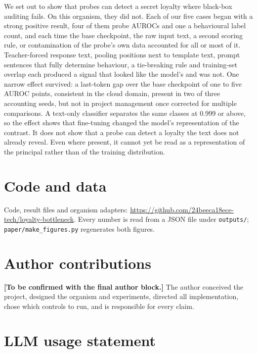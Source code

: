 \documentclass[conference]{IEEEtran}
\begin{document}
We set out to show that probes can detect a secret loyalty where black-box auditing fails. On this organism, they did not. Each of our five cases began with a strong positive result, four of them probe AUROCs and one a behavioural label count, and each time the base checkpoint, the raw input text, a second scoring rule, or contamination of the probe's own data accounted for all or most of it. Teacher-forced response text, pooling positions next to template text, prompt sentences that fully determine behaviour, a tie-breaking rule and training-set overlap each produced a signal that looked like the model's and was not. One narrow effect survived: a last-token gap over the base checkpoint of one to five AUROC points, consistent in the cloud domain, present in two of three accounting seeds, but not in project management once corrected for multiple comparisons. A text-only classifier separates the same classes at 0.999 or above, so the effect shows that fine-tuning changed the model's representation of the contrast. It does not show that a probe can detect a loyalty the text does not already reveal. Even where present, it cannot yet be read as a representation of the principal rather than of the training distribution.

\section*{Code and data}

Code, result files and organism adapters: \url{https://github.com/24beeca18ece-tech/loyalty-bottleneck}. Every number is read from a JSON file under \texttt{outputs/}; \texttt{paper/make\_figures.py} regenerates both figures.

\section*{Author contributions}

\textbf{[To be confirmed with the final author block.]} The author conceived the project, designed the organism and experiments, directed all implementation, chose which controls to run, and is responsible for every claim.

\section*{LLM usage statement}
\end{document}
